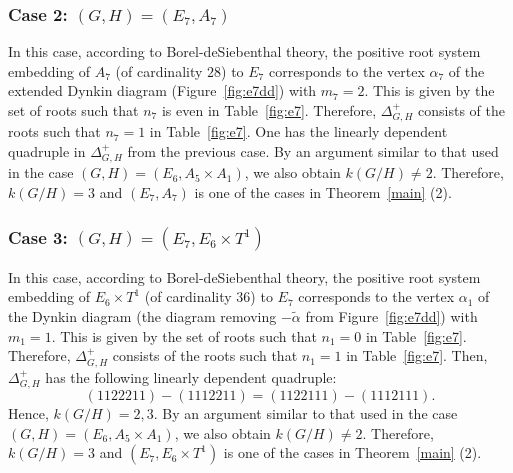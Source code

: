 \documentclass{amsart}
\theoremstyle{definition}
\theoremstyle{remark}
\numberwithin{equation}{section}
\begin{document}
\subsubsection{Case 2: $(G,H)=(E_{7},A_{7})$}
\label{sect:9.2.2}
In this case, according to Borel-deSiebenthal theory,
the positive root system embedding of $A_{7}$ (of cardinality $28$) to $E_{7}$ corresponds to the vertex $\alpha_{7}$ of the extended Dynkin diagram  (Figure~\ref{fig:e7dd}) with $m_{7}=2$.
This is given by the set of roots such that $n_{7}$ is even in Table~\ref{fig:e7}. 
Therefore, $\Delta_{G,H}^{+}$ consists of the roots such that $n_{7}=1$ in Table~\ref{fig:e7}.
One has the linearly dependent quadruple in $\Delta^{+}_{G,H}$ from the previous case.
By an argument similar to that used in the case $(G,H)=(E_{6},A_{5}\times A_{1})$, we also obtain $k(G/H)\not=2$.
Therefore, $k(G/H)=3$ and $(E_{7},A_{7})$ is one of the cases in Theorem~\ref{main} (2).

\subsubsection{Case 3: $(G,H)=(E_{7},E_{6}\times T^{1})$}
\label{sect:9.2.3}
In this case, according to Borel-deSiebenthal theory,
the positive root system embedding of $E_{6}\times T^{1}$ (of cardinality $36$) to $E_{7}$ corresponds to the vertex $\alpha_{1}$ of the Dynkin diagram (the diagram removing $-\widetilde{\alpha}$ from Figure~\ref{fig:e7dd}) with $m_{1}=1$.
This is given by the set of roots such that $n_{1}=0$ in Table~\ref{fig:e7}. 
Therefore, $\Delta_{G,H}^{+}$ consists of the roots such that $n_{1}=1$ in Table~\ref{fig:e7}.
Then, $\Delta^{+}_{G,H}$ has the following linearly dependent quadruple:
\[
(1122211)-(1112211)=(1122111)-(1112111).
\]
Hence, $k(G/H)=2,3$.
By an argument similar to that used in the case $(G,H)=(E_{6},A_{5}\times A_{1})$, we also obtain $k(G/H)\not=2$.
Therefore, $k(G/H)=3$ and $(E_{7},E_{6}\times T^{1})$ is one of the cases in Theorem~\ref{main} (2).

\end{document}
